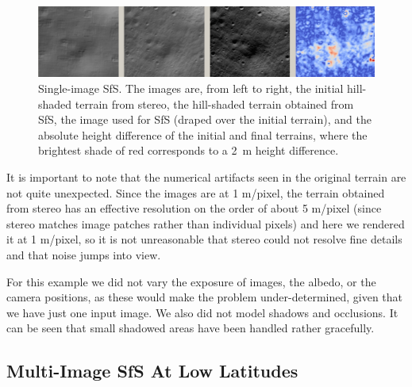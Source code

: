 \documentclass[12pt,oneside]{article}
\begin{document}
\begin{figure}[h!]
\begin{center}
\includegraphics[width=6in]{figures/sfs1.jpg}
\caption[sfs]{Single-image SfS. The images are, from left to right, the
  initial hill-shaded terrain from stereo, the hill-shaded terrain obtained from
  SfS, the image used for SfS (draped over the initial terrain), and the
  absolute height difference of the initial and final terrains, where
  the brightest shade of red corresponds to a 2~m height
  difference.}
\label{fig:sfs1}
\end{center}
\end{figure}

It is important to note that the numerical artifacts seen in the
original terrain are not quite unexpected. Since the images are at 1
m/pixel, the terrain obtained from stereo has an effective
resolution on the order of about 5 m/pixel (since stereo matches
image patches rather than individual pixels) and here we rendered it at
1 m/pixel, so it is not unreasonable that stereo could not resolve
fine details and that noise jumps into view. 


For this example we did not vary the exposure of images, the albedo, or
the camera positions, as these would make the problem under-determined,
given that we have just one input image.  We also did not model shadows
and occlusions. It can be seen that small shadowed areas have been
handled rather gracefully.

\subsection{Multi-Image SfS At Low Latitudes}
\label{multiple}
\end{document}
